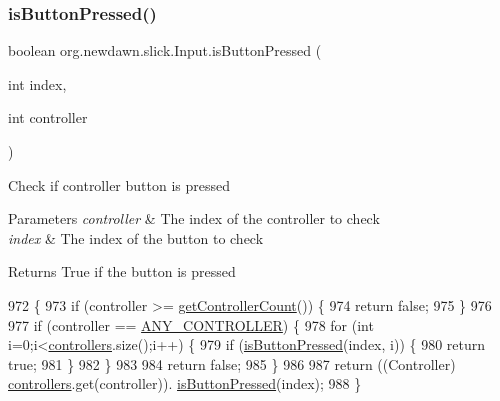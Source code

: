 \subsubsection{\texorpdfstring{is\+Button\+Pressed()}{isButtonPressed()}}
{\footnotesize\ttfamily boolean org.\+newdawn.\+slick.\+Input.\+is\+Button\+Pressed (\begin{DoxyParamCaption}\item[{int}]{index,  }\item[{int}]{controller }\end{DoxyParamCaption})\hspace{0.3cm}{\ttfamily [inline]}}

Check if controller button is pressed


\begin{DoxyParams}{Parameters}
{\em controller} & The index of the controller to check \\
\hline
{\em index} & The index of the button to check \\
\hline
\end{DoxyParams}
\begin{DoxyReturn}{Returns}
True if the button is pressed 
\end{DoxyReturn}

\begin{DoxyCode}
972                                                               \{
973         \textcolor{keywordflow}{if} (controller >= \mbox{\hyperlink{classorg_1_1newdawn_1_1slick_1_1_input_a4a81c87f7d16d49471106d7fbaa0989d}{getControllerCount}}()) \{
974             \textcolor{keywordflow}{return} \textcolor{keyword}{false};
975         \}
976 
977         \textcolor{keywordflow}{if} (controller == \mbox{\hyperlink{classorg_1_1newdawn_1_1slick_1_1_input_a1f3df3cf41eaf8ae3bdf194d5cf96dd0}{ANY\_CONTROLLER}}) \{
978             \textcolor{keywordflow}{for} (\textcolor{keywordtype}{int} i=0;i<\mbox{\hyperlink{classorg_1_1newdawn_1_1slick_1_1_input_a1bcc91bf0db9efc578bd934a8ed9ce67}{controllers}}.size();i++) \{
979                 \textcolor{keywordflow}{if} (\mbox{\hyperlink{classorg_1_1newdawn_1_1slick_1_1_input_a82287bcba0cef087bcb8a92f1bcd3d53}{isButtonPressed}}(index, i)) \{
980                     \textcolor{keywordflow}{return} \textcolor{keyword}{true};
981                 \}
982             \}
983             
984             \textcolor{keywordflow}{return} \textcolor{keyword}{false};
985         \}
986         
987         \textcolor{keywordflow}{return} ((Controller) \mbox{\hyperlink{classorg_1_1newdawn_1_1slick_1_1_input_a1bcc91bf0db9efc578bd934a8ed9ce67}{controllers}}.get(controller)).
      \mbox{\hyperlink{classorg_1_1newdawn_1_1slick_1_1_input_a82287bcba0cef087bcb8a92f1bcd3d53}{isButtonPressed}}(index);
988     \}
\end{DoxyCode}
\mbox{\label{classorg_1_1newdawn_1_1slick_1_1_input_a8ff621186883194fadb3382dcb308aed}} 
